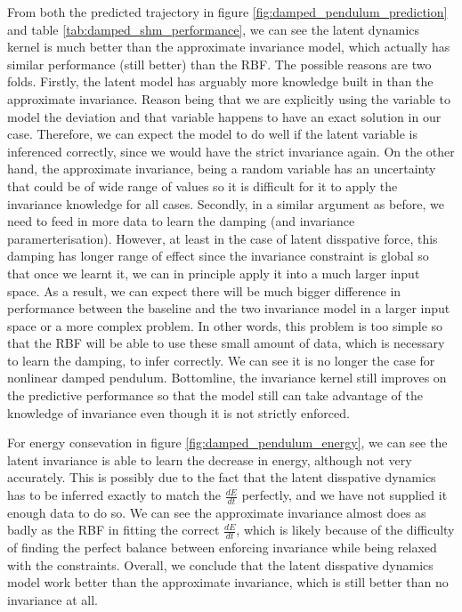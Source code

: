 \documentclass{statsmsc}
\begin{document}
From both the predicted trajectory in figure \ref{fig:damped_pendulum_prediction} and table \ref{tab:damped_shm_performance}, we can see the latent dynamics kernel is much better than the approximate invariance model, which actually has similar performance (still better) than the RBF. 
The possible reasons are two folds.
Firstly, the latent model has arguably more knowledge built in than the approximate invariance. Reason being that we are explicitly using the variable to model the deviation and that variable happens to have an exact solution in our case.
Therefore, we can expect the model to do well if the latent variable is inferenced correctly, since we would have the strict invariance again.
On the other hand, the approximate invariance, being a random variable has an uncertainty that could be of wide range of values so it is difficult for it to apply the invariance knowledge for all cases.
Secondly, in a similar argument as before, we need to feed in more data to learn the damping (and invariance paramerterisation).
However, at least in the case of latent disspative force, this damping has longer range of effect since the invariance constraint is global so that once we learnt it, we can in principle apply it into a much larger input space.
As a result, we can expect there will be much bigger difference in performance between the baseline and the two invariance model in a larger input space or a more complex problem.
In other words, this problem is too simple so that the RBF will be able to use these small amount of data, which is necessary to learn the damping, to infer correctly. 
We can see it is no longer the case for nonlinear damped pendulum.
Bottomline, the invariance kernel still improves on the predictive performance so that the model still can take advantage of the knowledge of invariance even though it is not strictly enforced. 

For energy consevation in figure \ref{fig:damped_pendulum_energy}, we can see the latent invariance is able to learn the decrease in energy, although not very accurately.
This is possibly due to the fact that the latent disspative dynamics has to be inferred exactly to match the $\frac{dE}{dt}$ perfectly, and we have not supplied it enough data to do so.
We can see the approximate invariance almost does as badly as the RBF in fitting the correct $\frac{dE}{dt}$, which is likely because of the difficulty of finding the perfect balance between enforcing invariance while being relaxed with the constraints.
Overall, we conclude that the latent disspative dynamics model work better than the approximate invariance, which is still better than no invariance at all.
\end{document}
